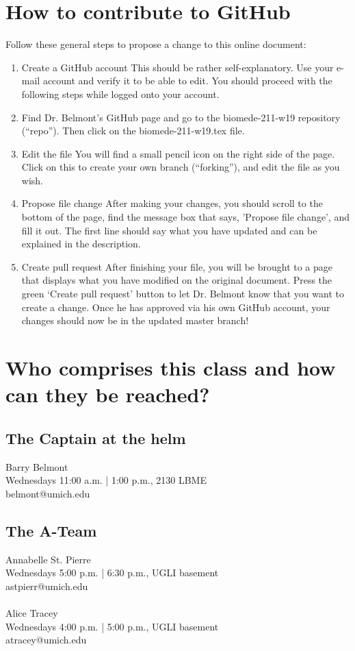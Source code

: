 \documentclass[11pt]{book}
\begin{document}
\section{How to contribute to GitHub}
Follow these general steps to propose a change to this online document:
\begin{enumerate}
\item Create a GitHub account
\subitem This should be rather self-explanatory. Use your e-mail account and verify it to be able to edit. You should proceed with the following steps while logged onto your account.
\item Find Dr. Belmont's GitHub page and go to the biomede-211-w19 repository (``repo''). Then click on the biomede-211-w19.tex file.
\item Edit the file
\subitem You will find a small pencil icon on the right side of the page. Click on this to create your own branch (``forking''), and edit the file as you wish.
\item Propose file change
\subitem After making your changes, you should scroll to the bottom of the page, find the message box that says, 'Propose file change', and fill it out. The first line should say what you have updated and can be explained in the description.
\item Create pull request
\subitem After finishing your file, you will be brought to a page that displays what you have modified on the original document. Press the green `Create pull request' button to let Dr. Belmont know that you want to create a change. Once he has approved via his own GitHub account, your changes should now be in the updated master branch!
\end{enumerate}

\newpage



\section{Who comprises this class and how can they be reached?}
\subsection{The Captain at the helm}
Barry Belmont \\ Wednesdays 11:00 a.m. | 1:00 p.m., 2130 LBME \\ belmont@umich.edu \\
\subsection{The A-Team}
Annabelle St. Pierre \\ Wednesdays 5:00 p.m. | 6:30 p.m., UGLI basement \\ astpierr@umich.edu \\
\\
Alice Tracey \\ Wednesdays 4:00 p.m. | 5:00 p.m., UGLI basement \\ atracey@umich.edu \\
\end{document}
